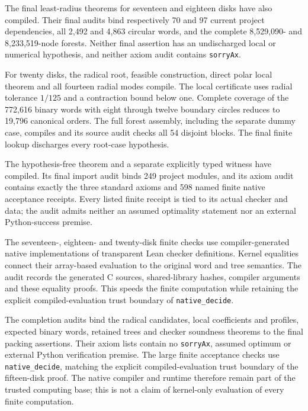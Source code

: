 \documentclass[11pt]{amsart}
\theoremstyle{definition}
\theoremstyle{remark}
\begin{document}
The final least-radius theorems for seventeen and eighteen disks have also
compiled. Their final
audits bind respectively 70 and 97 current project dependencies, all
2,492 and 4,863 circular words, and the complete 8,529,090- and
8,233,519-node forests. Neither final assertion has an undischarged local
or numerical hypothesis, and neither axiom audit contains \texttt{sorryAx}.

For twenty disks, the radical root, feasible construction, direct polar
local theorem and all fourteen radial modes compile. The local certificate
uses radial tolerance $1/125$ and a contraction bound below one. Complete
coverage of the 772,616 binary words with eight through twelve boundary
circles reduces to 19,796 canonical orders. The full forest assembly,
including the separate dummy case, compiles and its source audit checks
all 54 disjoint blocks. The final finite lookup discharges every root-case
hypothesis.

The hypothesis-free theorem  and a
separate explicitly typed witness have compiled. Its final import audit
binds 249 project modules, and its axiom audit contains exactly
the three standard axioms and 598 named finite native acceptance receipts.
Every listed finite receipt is tied to its actual checker and data; the
audit admits neither an assumed optimality statement nor an external
Python-success premise.

The seventeen-, eighteen- and twenty-disk finite checks use compiler-generated
native implementations of transparent Lean checker definitions. Kernel
equalities connect their array-based evaluation to the original word and
tree semantics. The audit records the generated C sources, shared-library
hashes, compiler arguments and these equality proofs. This speeds the
finite computation while retaining the explicit compiled-evaluation trust
boundary of \texttt{native\_decide}.

The completion audits bind the radical candidates, local coefficients
and profiles, expected binary words, retained trees and checker soundness
theorems to the final packing assertions. Their axiom lists contain no
\texttt{sorryAx}, assumed optimum or external Python verification premise.
The large finite acceptance checks use \texttt{native\_decide}, matching
the explicit compiled-evaluation trust boundary of the fifteen-disk proof.
The native compiler and runtime therefore remain part of the trusted
computing base; this is not a claim of kernel-only evaluation of every
finite computation.
\end{document}
